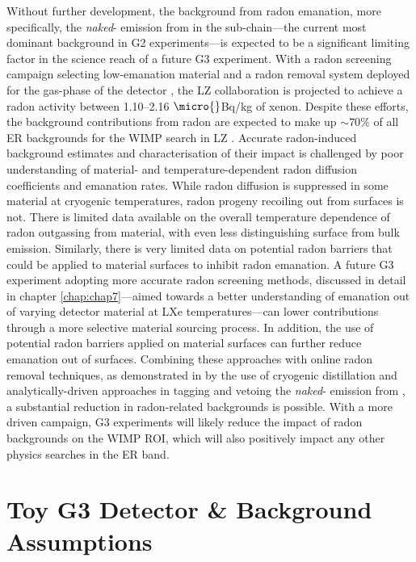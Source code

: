 Without further development, the background from radon emanation, more specifically, the \textit{naked}-\beta{} emission from \PbTOF{} in the \RnTTT{} sub-chain---the current most dominant background in G2 experiments---is expected to be a significant limiting factor in the science reach of a future G3 experiment. With a radon screening campaign selecting low-emanation material and a radon removal system deployed for the gas-phase of the detector \cite{lz_screening, lz_tdr}, the LZ collaboration is projected to achieve a radon activity between 1.10--2.16 $\micro{}$Bq/kg of xenon. Despite these efforts, the background contributions from radon are expected to make up $\sim70\%$ of all ER backgrounds for the WIMP search in LZ \cite{akerib2018projected}. Accurate radon-induced background estimates and characterisation of their impact is challenged by poor understanding of material- and temperature-dependent radon diffusion coefficients and emanation rates. While radon diffusion is suppressed in some material at cryogenic temperatures, radon progeny recoiling out from surfaces is not. There is limited data available on the overall temperature dependence of radon outgassing from material, with even less distinguishing surface from bulk emission. Similarly, there is very limited data on potential radon barriers that could be applied to material surfaces to inhibit radon emanation. A future G3 experiment adopting more accurate radon screening methods, discussed in detail in chapter \ref{chap:chap7}---aimed towards a better understanding of emanation out of varying detector material at LXe temperatures---can lower contributions through a more selective material sourcing process. In addition, the use of potential radon barriers applied on material surfaces can further reduce emanation out of surfaces. Combining these approaches with online radon removal techniques, as demonstrated in \cite{Aprile:2017kop} by the use of cryogenic distillation and analytically-driven approaches in tagging and vetoing the \textit{naked}-\beta{} emission from \PbTOF{}, a substantial reduction in radon-related backgrounds is possible. With a more driven campaign, G3 experiments will likely reduce the impact of radon backgrounds on the WIMP ROI, which will also positively impact any other physics searches in the ER band.  


\section{Toy G3 Detector \& Background Assumptions}
\label{sec:g3_assumptions}

